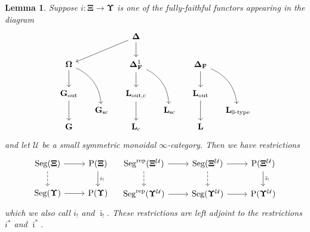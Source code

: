 \documentclass{amsart}
\numberwithin{theorem}{subsection}
\newtheorem{lemma}[theorem]{Lemma}
\theoremstyle{definition}
\newcommand{\finsetskel}{\mathbf{F}}
\newcommand{\xU}{\mathcal{U}}
\newcommand{\Pre}{\name{P}}
\newcommand{\name}[1]{\ensuremath{\text{\textup{#1}}}}
\newcommand{\simp}{\mathbf{\Delta}}
\newcommand{\bbO}{\mathbf{\Omega}}
\newcommand{\levelg}{\mathbf{L}}
\newcommand{\levelgconn}{\levelg_{\name{c}}}
\newcommand{\bbY}{\mathbf{G}}
\newcommand{\bbYout}{\bbY_{\name{out}}}
\newcommand{\gc}{\mathbf{\Xi}}
\newcommand{\gcone}{\gc}
\newcommand{\gctwo}{\mathbf{\Upsilon}}
\newcommand{\gcUone}{\gcone^\xU}
\newcommand{\gcUtwo}{\gctwo^\xU}
\newcommand{\barishriek}{\bar \imath_!}
\newcommand{\bariustar}{\bar \imath^*}
\newcommand{\Seg}{\name{Seg}}
\newcommand{\Segrep}{\Seg^{\name{rep}}}
\begin{document}
\begin{lemma}
\label{lemma: restriction of lke}
Suppose $i \colon \gcone \to \gctwo$ is one of the fully-faithful functors appearing in the diagram
\[ \begin{tikzcd}[column sep=small]
& & \simp \arrow[dll] \dar \\
\bbO \dar & & \simp_\finsetskel^1 \dar  & & \simp_\finsetskel \dar \\
\bbYout \arrow[dd] & & \levelg_{\name{out,c}}  \arrow[dd] & & \levelg_{\name{out}} \arrow[dd] \\[-1.5em]
& \bbY_{\name{sc}} \arrow[from=uul, bend left, crossing over] & & \levelg_{\name{sc}} \arrow[from=uul, bend left, crossing over] & & \levelg_{\name{0-type}} \arrow[from=uul, bend left, crossing over] \\[-1.5em]
\bbY & & \levelgconn  & & \levelg 
\end{tikzcd} \]
and let $\xU$ be a small symmetric monoidal $\infty$-category.
Then we have restrictions
\[ \begin{tikzcd}
\Seg(\gcone) \dar[dashed] \rar & \Pre(\gcone) \dar{i_!} \\
\Seg(\gctwo) \rar & \Pre(\gctwo)
\end{tikzcd} 
\quad
\begin{tikzcd}
\Segrep(\gcUone) \dar[dashed] \rar & \Seg(\gcUone) \dar[dashed] \rar & \Pre(\gcUone) \dar{\barishriek} \\
\Segrep(\gcUtwo) \rar & \Seg(\gcUtwo) \rar & \Pre(\gcUtwo)
\end{tikzcd} 
\]
which we also call $i_!$ and $\barishriek$.
These restrictions are left adjoint to the restrictions $i^*$ and $\bariustar$.
\end{lemma}
\end{document}

